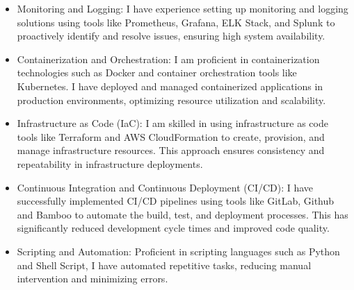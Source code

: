 \begin{itemize}

\item Monitoring and Logging: I have experience setting up monitoring and logging solutions using tools like Prometheus, Grafana, ELK Stack, and Splunk to proactively identify and resolve issues, ensuring high system availability.

\item Containerization and Orchestration: I am proficient in containerization technologies such as Docker and container orchestration tools like Kubernetes. I have deployed and managed containerized applications in production environments, optimizing resource utilization and scalability.

\item Infrastructure as Code (IaC): I am skilled in using infrastructure as code tools like Terraform and AWS CloudFormation to create, provision, and manage infrastructure resources. This approach ensures consistency and repeatability in infrastructure deployments.

\item Continuous Integration and Continuous Deployment (CI/CD): I have successfully implemented CI/CD pipelines using tools like GitLab, Github and Bamboo to automate the build, test, and deployment processes. This has significantly reduced development cycle times and improved code quality.

\item Scripting and Automation: Proficient in scripting languages such as Python and Shell Script, I have automated repetitive tasks, reducing manual intervention and minimizing errors.

\end{itemize}
